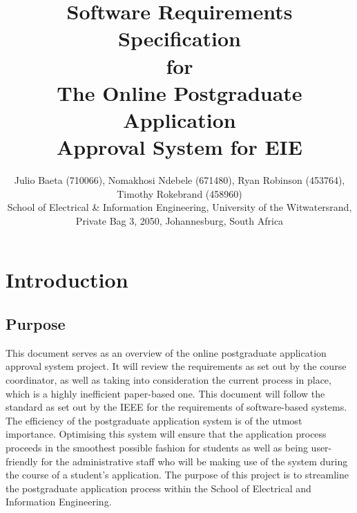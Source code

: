 \documentclass[journal,comsoc,onecolumn]{IEEEtran}
\begin{document}

\title{Software Requirements Specification \\ \vspace{7mm} for \\ \vspace{7mm} The Online Postgraduate Application \\ Approval System for EIE}

\author{\vspace{3mm} Julio Baeta (710066), Nomakhosi Ndebele (671480), Ryan Robinson (453764), Timothy Rokebrand (458960)\\ \small \vspace{2mm} School of Electrical \& Information Engineering, University of the Witwatersrand, Private Bag 3, 2050, Johannesburg, South Africa}

\markboth{}{}

\maketitle

\thispagestyle{empty}


\newpage

\tableofcontents

\pagestyle{fancy}
\renewcommand{\headrulewidth}{0pt}

\IEEEpeerreviewmaketitle


\newpage

\section{Introduction}

\subsection{Purpose}
This document serves as an overview of the online postgraduate application approval system project. It will review the requirements as set out by the course coordinator, as well as taking into consideration the current process in place, which is a highly inefficient paper-based one. This document will follow the standard as set out by the IEEE for the requirements of software-based systems.
The efficiency of the postgraduate application system is of the utmost importance. Optimising this system will ensure that the application process proceeds in the smoothest possible fashion for students as well as being user-friendly for the administrative staff who will be making use of the system during the course of a student's application.
The purpose of this project is to streamline the postgraduate application process within the School of Electrical and Information Engineering.
\end{document}
